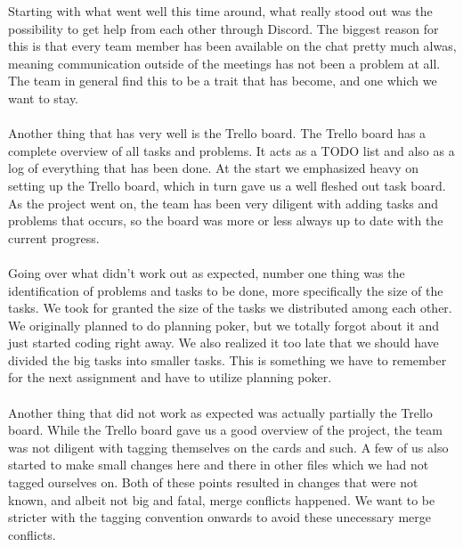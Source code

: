 \documentclass{article}
\begin{document}
\maketitle
Starting with what went well this time around, what really stood out was the possibility to get help from each other through Discord. The biggest reason for this is that every team member has been available on the chat pretty much alwas, meaning communication outside of the meetings has not been a problem at all. The team in general find this to be a trait that has become, and one which we want to stay.\\\\
Another thing that has very well is the Trello board. The Trello board has a complete overview of all tasks and problems. It acts as a TODO list and also as a log of everything that has been done. At the start we emphasized heavy on setting up the Trello board, which in turn gave us a well fleshed out task board. As the project went on, the team has been very diligent with adding tasks and problems that occurs, so the board was more or less always up to date with the current progress.\\\\
Going over what didn't work out as expected, number one thing was the identification of problems and tasks to be done, more specifically the size of the tasks. We took for granted the size of the tasks we distributed among each other. We originally planned to do planning poker, but we totally forgot about it and just started coding right away. We also realized it too late that we should have divided the big tasks into smaller tasks. This is something we have to remember for the next assignment and have to utilize planning poker.\\\\
Another thing that did not work as expected was actually partially the Trello board. While the Trello board gave us a good overview of the project, the team was not diligent with tagging themselves on the cards and such. A few of us also started to make small changes here and there in other files which we had not tagged ourselves on. Both of these points resulted in changes that were not known, and albeit not big and fatal, merge conflicts happened. We want to be stricter with the tagging convention onwards to avoid these unecessary merge conflicts.
\end{document}
